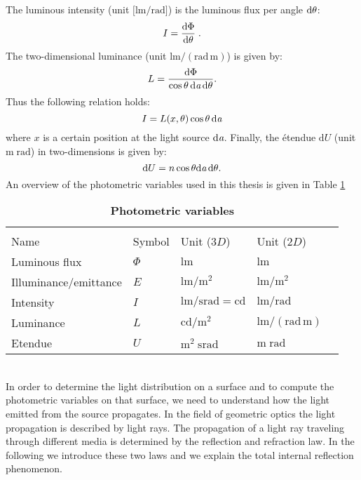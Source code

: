 The luminous intensity \big(unit $\big[\textrm{lm}/\textrm{rad}\big]$\big) is the luminous flux per angle $\textrm{d}\theta$:
 \begin{equation}
 I=\frac{\textrm{d}\Phi}{\textrm{d}\theta}\;.
 \end{equation}
 The two-dimensional luminance (unit $\textrm{lm}/(\textrm{rad}\,\textrm{m})$) is given by:
 \begin{equation}
 L= \frac{\textrm {d}\Phi}{\cos\theta\,\textrm{d}\textit{a} \,\textrm{d}\theta}.
 \end{equation}
 Thus the following relation holds:
 \begin{equation}
 I = L(x, \theta)\cos\theta\,\textrm{d}\textit{a}
 \end{equation}
where $x$ is a certain position at the light source $\textrm{d}\textit{a}$. 
 Finally, the \'{e}tendue $\textrm{d}U $ (unit $\textrm{m}\;\textrm{rad}$) in two-dimensions is given by:
\begin{equation}\label{etendue2d}
\textrm{d}U = n\cos\theta\textrm{d}\textit{a}\,\textrm{d}\theta.
\end{equation}
An overview of the photometric variables used in this thesis is given in Table \ref{tab:photometric_variables}
\begin{table}[t] 
\centering
\caption{\bf Photometric variables}
\begin{tabular}{lllll}
 \hline   \\
Name  & Symbol & Unit ($3D$) & Unit ($2D$) \\
  \hline 
Luminous flux & $\Phi$   & $\textrm{lm}$   &  $\textrm{lm}$ \\
Illuminance/emittance  & $E$    & $\textrm{lm}/{\textrm{m}^2} $ & $\textrm{lm}/{\textrm{m}^2}$  \\
Intensity  & $I$    & $\textrm{lm}/{\textrm{srad}} = \textrm{cd}$  & $\textrm{lm}/\textrm{rad}$ \\
Luminance  & $L$  & $ \textrm{cd}/{\textrm{m}^2}$   & $\textrm{lm}/(\textrm{rad} \,\textrm{m})$ \\
Etendue & $U$  & $\textrm{m}^2\; \textrm{srad}$   & $\textrm{m}\; \textrm{rad}$ \\
 \hline
 \end{tabular}
\label{tab:photometric_variables}
 \end{table}
\\ \indent In order to determine the light distribution on a surface and to compute the photometric variables on that surface, we need to understand how the light emitted from the source propagates. In the field of geometric optics the light propagation is described by light rays.
The propagation of a light ray traveling through  different media is determined by the reflection and refraction law.
In the following we introduce these two laws and we explain the total internal reflection phenomenon.
